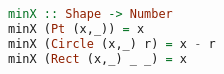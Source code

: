 \begin{lstlisting}[language=haskell]
minX :: Shape -> Number
minX (Pt (x,_)) = x
minX (Circle (x,_) r) = x - r
minX (Rect (x,_) _ _) = x
\end{lstlisting}